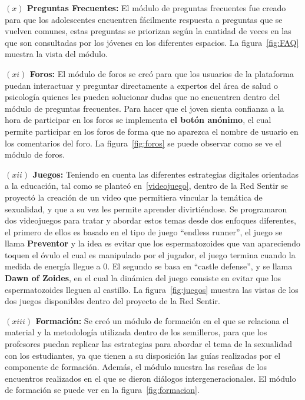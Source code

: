 \documentclass[journal,transmag]{IEEEtran}
\begin{document}
\textbf{$(x)$ Preguntas Frecuentes:} El módulo de preguntas frecuentes fue creado para que los adolescentes encuentren fácilmente respuesta a preguntas que se vuelven comunes, estas preguntas se priorizan según la cantidad de veces en las que son consultadas por los jóvenes en los diferentes espacios. La figura~\ref{fig:FAQ} muestra la vista del módulo.

\textbf{$(xi)$ Foros:} El módulo de foros se creó para que los usuarios de la plataforma puedan interactuar y preguntar directamente a expertos del área de salud o psicología quienes les pueden solucionar dudas que no encuentren dentro del módulo de preguntas frecuentes. Para hacer que el joven sienta confianza a la hora de participar en los foros se implementa  \textbf{el botón anónimo}, el cual permite participar en los foros de forma que no aparezca el nombre de usuario en los comentarios del foro. La figura~\ref{fig:foros} se puede observar como se ve el módulo de foros.

\textbf{$(xii)$ Juegos:} Teniendo en cuenta las diferentes estrategias digitales orientadas a la educación, tal como se planteó en~\ref{videojuego}, dentro de la Red Sentir se proyectó la creación de un video que permitiera vincular la temática de sexualidad, y que a su vez les permite aprender divirtiéndose. Se programaron dos videojuegos para tratar y abordar estos temas desde dos enfoques diferentes, el primero de ellos es basado en el tipo de juego ``endless runner'', el juego se llama \textbf{Preventor} y la idea es evitar que los espermatozoides que van apareciendo toquen el óvulo el cual es manipulado por el jugador, el juego termina cuando la medida de energía llegue a $0$. El segundo se basa en ``castle defense'', y se llama \textbf{Dawn of Zoides}, en el cual la dinámica del juego consiste en evitar que los espermatozoides lleguen al castillo.  La figura~\ref{fig:juegos} muestra las vistas de los dos juegos disponibles dentro del proyecto de la Red Sentir.

\textbf{$(xiii)$ Formación:} Se creó un módulo de formación en el que se relaciona el material y la metodología utilizada dentro de los semilleros, para que los profesores puedan replicar las estrategias para abordar el tema de la sexualidad con los estudiantes, ya que tienen a su disposición las guías realizadas por el componente de formación. Además, el módulo muestra las reseñas de los encuentros realizados en el que se dieron diálogos intergeneracionales. El módulo de formación se puede ver en la figura~\ref{fig:formacion}.
\end{document}
